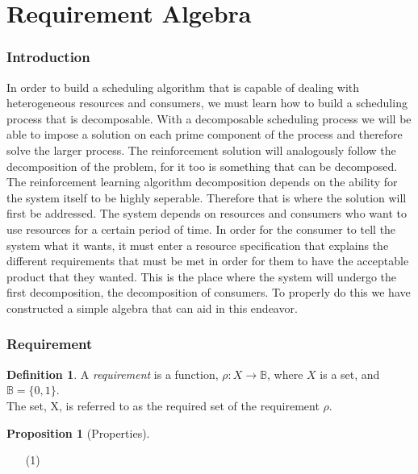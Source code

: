 \documentclass{article}
\theoremstyle{definition}
\newtheorem{definition}{Definition}[section]
\theoremstyle{remark}
\theoremstyle{theorem}
\theoremstyle{definition}
\newtheorem{proposition}{Proposition}[section]
\newcommand{\reqfunc}[2]{#1:#2\rightarrow\mathbb{B}}
\begin{document}
	
	
	\part{Requirement Algebra}
	
	\section{Introduction}
	
	In order to build a scheduling algorithm that is capable of dealing with heterogeneous resources and consumers, we must learn how to build a scheduling process that is decomposable. With a decomposable scheduling process we will be able to impose a solution on each prime component of the process and therefore solve the larger process. The reinforcement solution will analogously follow the decomposition of the problem, for it too is something that can be decomposed.  \\
	
	The reinforcement learning algorithm decomposition depends on the ability for the system itself to be highly seperable. Therefore that is where the solution will first be addressed. The system depends on resources and consumers who want to use resources for a certain period of time. In order for the consumer to tell the system what it wants, it must enter a resource specification that explains the different requirements that must be met in order for them to have the acceptable product that they wanted. This is the place where the system will undergo the first decomposition, the decomposition of consumers. To properly do this we have constructed a simple algebra that can aid in this endeavor.
	
	\section{Requirement}
	
		\begin{definition} 
			A \emph{requirement} is a function, $\reqfunc{\rho}{X}$, where $X$ is a set, and $\mathbb{B} = \{0,1\}$.\\
			
			The set, X, is referred to as the required set of the requirement $\rho$.
		\end{definition}
	
	    \begin{proposition}[Properties]
	    	
	    	\begin{enumerate}
	    		\item[(1)]
	    	\end{enumerate}
	    \end{proposition}
	
\end{document}
